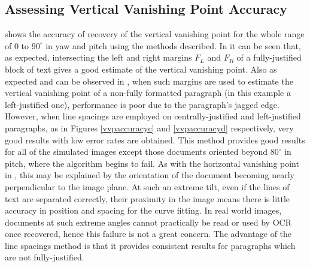 \subsection{Assessing Vertical Vanishing Point Accuracy}
 shows the accuracy of recovery of the vertical vanishing
point for the whole range of $0$ to $90^\circ$ in yaw and pitch using the
methods described.  In  it can be seen that, as expected,
intersecting the left and right margins $F_L$ and $F_R$ of a fully-justified block of text gives a
good estimate of the vertical vanishing point.  Also as expected and can be
observed in , when such margins are used to estimate the
vertical vanishing point of a non-fully formatted paragraph (in this example a
left-justified one), performance is poor due to the paragraph's jagged edge.
However, when line
spacings are employed on centrally-justified and left-justified  paragraphs, as
in Figures \ref{vvpaccuracyc} and \ref{vvpaccuracyd} respectively, very good
results with low error rates are obtained. 
This method provides good
results  for all of the simulated images except those
documents oriented beyond $80^\circ$ in pitch, where the algorithm begins to
fail. 
As with the horizontal vanishing point in , this may be
explained by the orientation of the document becoming nearly perpendicular to
the image plane. At such an extreme tilt, even if the lines of text are
separated correctly, their proximity in the image means there is little accuracy
in position and spacing for the curve fitting. In real world images, documents
at such extreme angles cannot practically be read or used by OCR once recovered,
hence this failure is not a great concern. The advantage of the line spacings
method is that it provides consistent results for paragraphs which are not 
fully-justified. 




